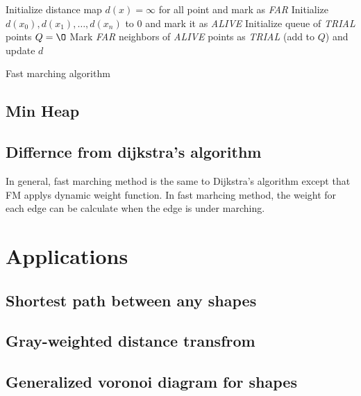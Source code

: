 \begin{algorithm}[H]
\label{alg:fast-marching}
\SetAlgoLined
{}
Initialize distance map $d(x) = \infty$ for all point and mark as \emph{FAR} \;
Initialize $d(x_0),d(x_1),\ldots,d(x_n)$ to $0$ and mark it as \emph{ALIVE} \;
Initialize queue of \emph{TRIAL} points $Q = \O$ \;
Mark \emph{FAR} neighbors of \emph{ALIVE} points as \emph{TRIAL} (add to $Q$) and update $d$ \;
\caption{Fast marching algorithm}
\end{algorithm}
\subsection{Min Heap}

\subsection{Differnce from dijkstra's algorithm}
In general, fast marching method is the same to Dijkstra's algorithm except that FM applys dynamic weight function. In fast marhcing method, the weight for each edge can be calculate when the edge is under marching.
\section{Applications}
\subsection{Shortest path between any shapes}

\subsection{Gray-weighted distance transfrom}
\subsection{Generalized voronoi diagram for shapes} \label{subsec:gvd}
